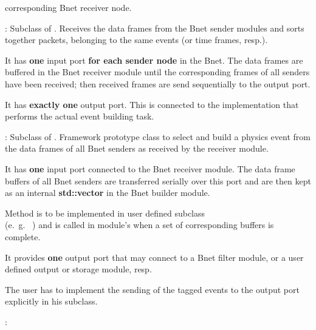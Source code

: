 \begin{description}
\begin{compactenum}
      corresponding Bnet receiver node.
\end{compactenum}
\item[\class{bnet::ReceiverModule}] : 
Subclass of . 
   Receives the data frames from the Bnet sender modules and 
   sorts together packets, belonging to the same events (or time frames, resp.).
\begin{compactenum}
  \item It has {\bf one} input port {\bf for each sender node} in the Bnet. 
      The data frames are buffered in the Bnet receiver module until the 
      corresponding frames of all senders have been received; then received 
      frames are send sequentially to the output port.
  \item It has {\bf exactly one} output port. This is connected to the 
       implementation 
      that performs the actual event building task.
\end{compactenum}
\item[\class{bnet::BuilderModule}] : 
	Subclass of . 
   Framework prototype class to select and build a physics event from 
   the data frames of all Bnet senders as received by the receiver module.
\begin{compactenum}
  \item It has {\bf one} input port connected to the Bnet receiver module. 
      The data frame buffers of all Bnet senders are transferred serially 
      over this port and are then kept as an internal {\bf std::vector} in the Bnet builder module.
  \item Method  is to be implemented in user defined subclass \\
      (e.~g.~ ) and is called in module's 
       when a set of corresponding buffers is complete.
  \item It provides {\bf one} output port that may connect to a 
      Bnet filter module, or a user defined output or storage module, resp. 
  \item The user has to implement the sending of the tagged 
      events to the output port explicitly in his subclass. 
\end{compactenum}
\item[\class{bnet::FilterModule}] : 

\end{description}
